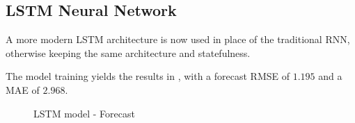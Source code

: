 \documentclass{scrartcl}
\begin{document}
  \subsection*{LSTM Neural Network}
    
    A more modern LSTM architecture is now used in place of the traditional RNN, otherwise keeping the same architecture and statefulness.

    The model training yields the results in , with a forecast RMSE of $1.195$ and a MAE of $2.968$.

    \begin{figure}[ht]
      \centering
      
      \caption{LSTM model - Forecast}
      \label{fig:lstm_fit}
    \end{figure}
\end{document}
